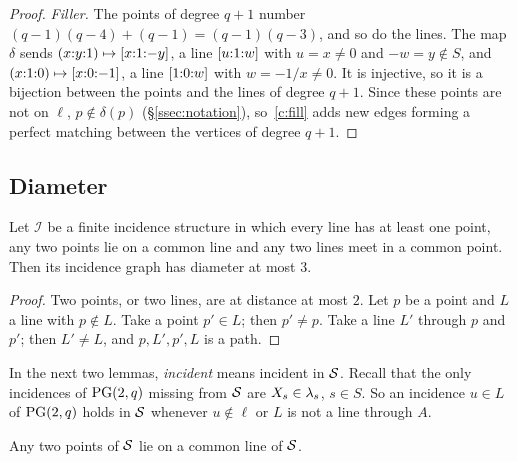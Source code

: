 \begin{proof}
\emph{Filler.} The points of degree $q+1$ number $(q-1)(q-4) + (q-1) = (q-1)(q-3)$, and so do the lines. The map $\delta$ sends $({x}{:}{y}{:}{1}) \mapsto [{x}{:}{1}{:}{-y}]$, a line $[{u}{:}{1}{:}{w}]$ with $u = x \ne 0$ and $-w = y \notin S$, and $({x}{:}{1}{:}{0}) \mapsto [{x}{:}{0}{:}{-1}]$, a line $[{1}{:}{0}{:}{w}]$ with $w = -1/x \ne 0$. It is injective, so it is a bijection between the points and the lines of degree $q+1$. Since these points are not on $\ell$, $p \notin \delta(p)$ (\S\ref{ssec:notation}), so~\ref{c:fill} adds new edges forming a perfect matching between the vertices of degree $q+1$.
\end{proof}

\subsection{Diameter}

\begin{lemma}\label{lem:coords-reduce}
Let $\mathcal{I}$ be a finite incidence structure in which every line has at least one point, any two points lie on a common line and any two lines meet in a common point. Then its incidence graph has diameter at most $3$.
\end{lemma}

\begin{proof}
Two points, or two lines, are at distance at most $2$. Let $p$ be a point and $L$ a line with $p \notin L$. Take a point $p' \in L$; then $p' \ne p$. Take a line $L'$ through $p$ and $p'$; then $L' \ne L$, and $p, L', p', L$ is a path.
\end{proof}

In the next two lemmas, \emph{incident} means incident in $\mathcal{S}$. Recall that the only incidences of $\mathrm{PG}(2,q)$ missing from $\mathcal{S}$ are $X_s \in \lambda_s$, $s \in S$. So an incidence $u \in L$ of $\mathrm{PG}(2,q)$ holds in $\mathcal{S}$ whenever $u \notin \ell$ or $L$ is not a line through $A$.

\begin{lemma}[Points]\label{lem:coords-points}
Any two points of $\mathcal{S}$ lie on a common line of $\mathcal{S}$.
\end{lemma}

